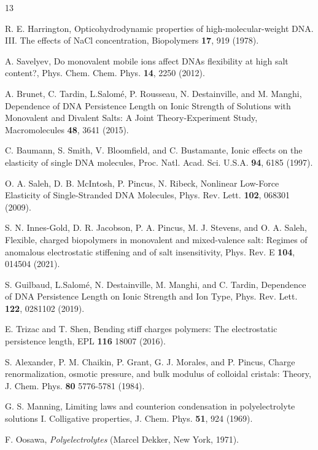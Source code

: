 \documentclass[aps,pre,twocolumn]{revtex4}
\begin{document}
\begin{thebibliography}{13}

  R. E. Harrington, Opticohydrodynamic properties of high-molecular-weight DNA. III. The effects of NaCl concentration, Biopolymers \textbf{17}, 919 (1978).

 A. Savelyev, Do monovalent mobile ions affect DNAs flexibility at high salt content?, Phys. Chem. Chem. Phys. \textbf{14}, 2250 (2012).

 A. Brunet, C. Tardin, L.Salom\' e, P. Rousseau, N. Destainville, and M. Manghi, Dependence of DNA Persistence Length on Ionic Strength of Solutions with Monovalent and Divalent Salts: A Joint Theory-Experiment Study, {Macromolecules} \textbf{48}, 3641 (2015).

 C. Baumann, S. Smith, V. Bloomfield, and C. Bustamante, Ionic effects on the elasticity of single DNA molecules, Proc. Natl. Acad. Sci. U.S.A. {\bf 94}, 6185 (1997).

 O. A. Saleh, D. B. McIntosh, P. Pincus, N. Ribeck, Nonlinear Low-Force Elasticity of Single-Stranded DNA Molecules, Phys. Rev. Lett. {\bf 102}, 068301 (2009).

 S. N. Innes-Gold, D. R. Jacobson, P. A. Pincus, M. J. Stevens, and O. A. Saleh, Flexible, charged biopolymers in monovalent and mixed-valence salt: Regimes of anomalous electrostatic stiffening and of salt insensitivity, Phys. Rev. E \textbf{104}, 014504 (2021).

 S. Guilbaud, L.Salom\'e, N. Destainville, M. Manghi, and C. Tardin, Dependence of DNA Persistence Length on Ionic Strength and Ion Type, Phys. Rev. Lett. \textbf{122}, 0281102 (2019).

 E. Trizac and T. Shen, Bending stiff charges polymers: The electrostatic persistence length, {EPL} \textbf{116} 18007 (2016).

S. Alexander, P. M. Chaikin, P. Grant, G. J. Morales, and P. Pincus, Charge renormalization, osmotic pressure, and bulk modulus of colloidal cristals: Theory, J. Chem. Phys. \textbf{80} 5776-5781 (1984).

G. S. Manning, Limiting laws and counterion condensation in polyelectrolyte solutions I. Colligative properties, J. Chem. Phys. \textbf{51}, 924 (1969).

F. Oosawa, \textit{Polyelectrolytes} (Marcel Dekker, New York, 1971).


\end{thebibliography}
\end{document}
